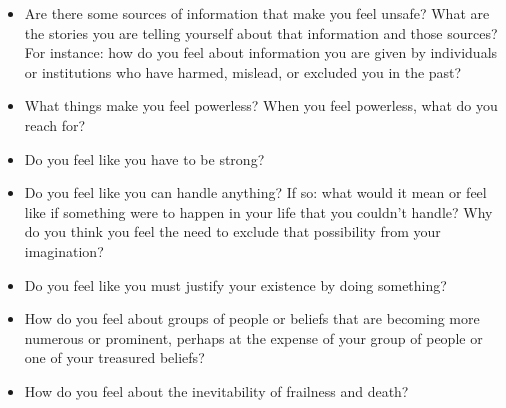 \documentclass[12pt,letterpaper]{article}
\begin{document}
\begin{itemize}
    \item Are there some sources of information that make you feel unsafe? What are the stories you are telling yourself about that information and those sources? For instance: how do you feel about information you are given by individuals or institutions who have harmed, mislead, or excluded you in the past?
    \item What things make you feel powerless? When you feel powerless, what do you reach for?
    \item Do you feel like you have to be strong?
    \item Do you feel like you can handle anything? If so: what would it mean or feel like if something were to happen in your life that you couldn't handle? Why do you think you feel the need to exclude that possibility from your imagination?
    \item Do you feel like you must justify your existence by doing something?
    \item How do you feel about groups of people or beliefs that are becoming more numerous or prominent, perhaps at the expense of your group of people or one of your treasured beliefs?
    \item How do you feel about the inevitability of frailness and death?
\end{itemize}
\end{document}
